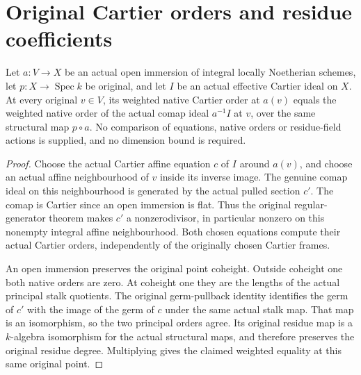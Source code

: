 \section{Original Cartier orders and residue coefficients}

\begin{theorem}
\label{thm:intrinsic-numerical-cartier-order-open-pullback}
\leanok
Let $a:V\to X$ be an actual open immersion of integral locally
Noetherian schemes, let $p:X\to\operatorname{Spec}k$ be original,
and let $I$ be an actual effective Cartier ideal on $X$.
At every original $v\in V$, its weighted native Cartier order at
$a(v)$ equals the weighted native order of the actual comap ideal
$a^{-1}I$ at $v$, over the same structural map $p\circ a$.
No comparison of equations, native orders or residue-field actions is
supplied, and no dimension bound is required.
\end{theorem}
\begin{proof}
Choose the actual Cartier affine equation $c$ of $I$ around $a(v)$,
and choose an actual affine neighbourhood of $v$ inside its inverse
image. The genuine comap ideal on this neighbourhood is generated by
the actual pulled section $c'$. The comap is Cartier since an open
immersion is flat. Thus the original regular-generator theorem makes
$c'$ a nonzerodivisor, in particular nonzero on this nonempty integral
affine neighbourhood. Both chosen equations compute their actual
Cartier orders, independently of the originally chosen Cartier frames.

An open immersion preserves the original point coheight. Outside
coheight one both native orders are zero. At coheight one they are the
lengths of the actual principal stalk quotients. The original
germ-pullback identity identifies the germ of $c'$ with the image of
the germ of $c$ under the same actual stalk map. That map is an
isomorphism, so the two principal orders agree. Its original residue
map is a $k$-algebra isomorphism for the actual structural maps, and
therefore preserves the original residue degree. Multiplying gives
the claimed weighted equality at this same original point.
\end{proof}

